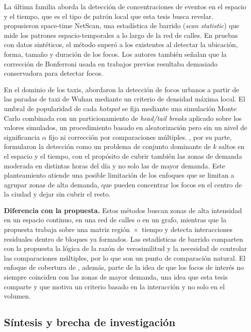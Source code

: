 La última familia aborda la detección de concentraciones de eventos en el
espacio y el tiempo, que es el tipo de patrón local que esta tesis busca
revelar. \citet{Shiode2022} propusieron space-time NetScan, una
estadística de barrido (\emph{scan statistic}) que mide los patrones
espacio-temporales a lo largo de la red de calles. En pruebas con datos
sintéticos, el método superó a los existentes al detectar la ubicación,
forma, tamaño y duración de los focos. Los autores también señalan que la
corrección de Bonferroni usada en trabajos previos resultaba demasiado
conservadora para detectar focos.

En el dominio de los taxis, \citet{Chen2021hotspots} abordaron la detección
de focos urbanos a partir de las paradas de taxi de Wuhan mediante un criterio
de densidad máxima local. El umbral de popularidad de cada \emph{hotspot} se fija
mediante una simulación Monte Carlo combinada con un particionamiento de
\emph{head/tail breaks} aplicado sobre los valores simulados, un procedimiento
basado en aleatorización pero sin un nivel de
significancia $\alpha$ fijo ni corrección por comparaciones múltiples.
\citet{Mishra2025}, por su parte, formularon la detección como un problema de
conjunto dominante de $k$ saltos en el espacio y el tiempo, con el propósito de
cubrir también las zonas de demanda moderada en distintas horas del día y no
solo las de mayor demanda. Este planteamiento atiende una posible limitación de
los enfoques que se limitan a agrupar zonas de alta demanda, que pueden
concentrar los focos en el centro de la ciudad y dejar sin cubrir el resto.

\textbf{Diferencia con la propuesta.} Estos métodos buscan zonas de alta
intensidad en un espacio continuo, en una red de calles o en un grafo,
mientras que la propuesta trabaja sobre una matriz región~$\times$~tiempo y
detecta interacciones residuales dentro de bloques ya formados. Las
estadísticas de barrido comparten con la propuesta la lógica de la razón de
verosimilitud y la necesidad de controlar las comparaciones múltiples, por
lo que son un punto de comparación natural. El enfoque de cobertura de
\citet{Mishra2025}, además, parte de la idea de que los focos de interés no
siempre coinciden con las zonas de mayor demanda, una idea que esta tesis
comparte y que motiva un criterio basado en la interacción y no solo en el
volumen.

\subsection{Síntesis y brecha de investigación}
\label{sec:ea_sintesis}


